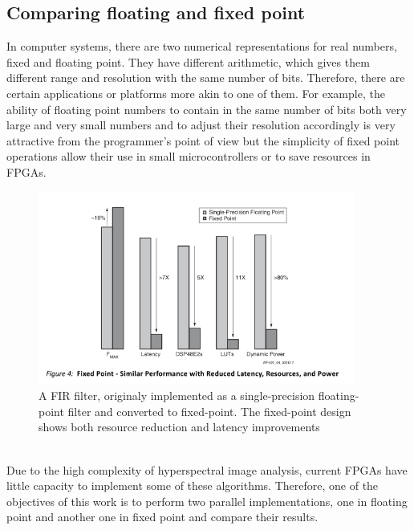 \subsection{Comparing floating and fixed point}
\label{makereference}

In computer systems, there are two numerical representations for real numbers, fixed and floating point. They have different arithmetic, which gives them different range and resolution with the same number of bits. Therefore, there are certain applications or platforms more akin to one of them. For example, the ability of floating point numbers to contain in the same number of bits both very large and very small numbers and to adjust their resolution accordingly is very attractive from the programmer's point of view but the simplicity of fixed point operations allow their use in small microcontrollers or to save resources in FPGAs.%
\begin{figure}[h!]
\centering
\includegraphics[height=2.5in]{figures/fp_vs_fp.png}
\caption{A FIR filter, originaly implemented as a single-precision floating-point filter and converted to fixed-point. The fixed-point design shows both resource reduction and latency improvements}
  \label{fig:fp}
\end{figure}
\\
Due to the high complexity of hyperspectral image analysis, current FPGAs have little capacity to implement some of these algorithms. Therefore, one of the objectives of this work is to perform two parallel implementations, one in floating point and another one in fixed point and compare their results.

\pagebreak
